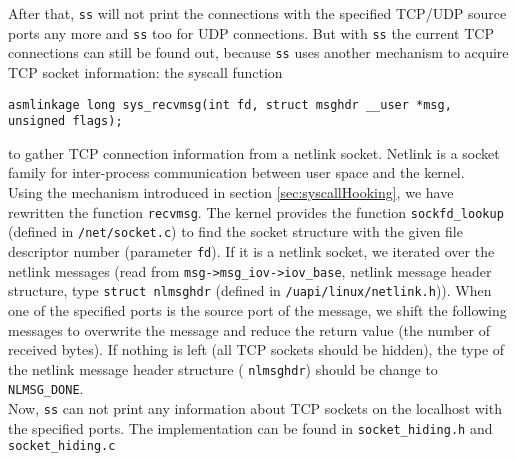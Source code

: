 After that, \texttt{ss} will not print the connections with the specified 
TCP/UDP source ports any more and \texttt{ss} too for UDP connections. But with \texttt{ss} the current TCP connections 
can still be found out, because \texttt{ss} uses another mechanism to acquire TCP 
socket information: the syscall function 
\lstset{escapechar=,style=customc}
\begin{lstlisting}
asmlinkage long sys_recvmsg(int fd, struct msghdr __user *msg, unsigned flags);
\end{lstlisting}
to gather TCP connection information from a netlink socket. Netlink is a socket 
family for inter-process communication between user space and the kernel.\\
Using the mechanism introduced in section \ref{sec:syscallHooking}, we have 
rewritten the function \verb+recvmsg+. The kernel provides the function 
\verb+sockfd_lookup+ (defined in \verb+/net/socket.c+) to find the socket 
structure with the given file descriptor number (parameter \verb+fd+). If it is 
a netlink socket, we iterated over the netlink messages (read from 
\verb+msg->msg_iov->iov_base+, netlink message header structure, type 
\verb+struct nlmsghdr+ (defined in \verb+/uapi/linux/netlink.h+)). When one 
of the specified ports is the source port of the message, we shift the following 
messages to overwrite the message and reduce the return value (the number of 
received bytes). If nothing is left (all TCP sockets should be hidden), the type 
of the netlink message header structure ( \verb+nlmsghdr+) should be change to 
\verb+NLMSG_DONE+. \\
Now, \texttt{ss} can not print any information about TCP sockets on the 
localhost with the specified ports. The implementation can be found in 
\verb+socket_hiding.h+ and \verb+socket_hiding.c+\\

